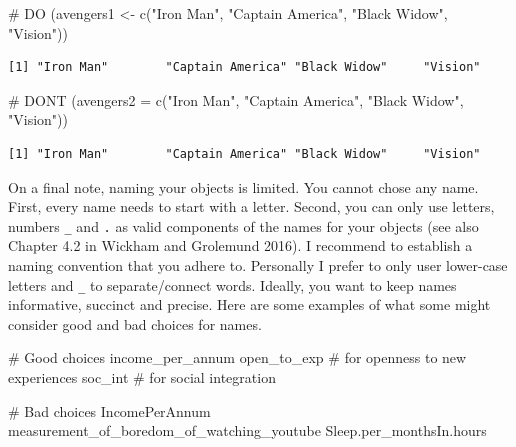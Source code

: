\documentclass[
  letterpaper,
  DIV=11,
  numbers=noendperiod]{scrreprt}
\newenvironment{Shaded}{\begin{snugshade}}{\end{snugshade}}
\newcommand{\AttributeTok}[1]{\textcolor[rgb]{0.40,0.45,0.13}{#1}}
\newcommand{\CommentTok}[1]{\textcolor[rgb]{0.37,0.37,0.37}{#1}}
\newcommand{\FunctionTok}[1]{\textcolor[rgb]{0.28,0.35,0.67}{#1}}
\newcommand{\NormalTok}[1]{\textcolor[rgb]{0.00,0.23,0.31}{#1}}
\newcommand{\OtherTok}[1]{\textcolor[rgb]{0.00,0.23,0.31}{#1}}
\newcommand{\StringTok}[1]{\textcolor[rgb]{0.13,0.47,0.30}{#1}}
\begin{document}
\begin{Shaded}
\begin{Highlighting}[]
\CommentTok{\# DO}
\NormalTok{(avengers1 }\OtherTok{\textless{}{-}} \FunctionTok{c}\NormalTok{(}\StringTok{"Iron Man"}\NormalTok{,}
                \StringTok{"Captain America"}\NormalTok{,}
                \StringTok{"Black Widow"}\NormalTok{,}
                \StringTok{"Vision"}\NormalTok{))}
\end{Highlighting}
\end{Shaded}

\begin{verbatim}
[1] "Iron Man"        "Captain America" "Black Widow"     "Vision"         
\end{verbatim}

\begin{Shaded}
\begin{Highlighting}[]
\CommentTok{\# DON\textquotesingle{}T}
\NormalTok{(}\AttributeTok{avengers2 =} \FunctionTok{c}\NormalTok{(}\StringTok{"Iron Man"}\NormalTok{,}
               \StringTok{"Captain America"}\NormalTok{,}
               \StringTok{"Black Widow"}\NormalTok{,}
               \StringTok{"Vision"}\NormalTok{))}
\end{Highlighting}
\end{Shaded}

\begin{verbatim}
[1] "Iron Man"        "Captain America" "Black Widow"     "Vision"         
\end{verbatim}

On a final note, naming your objects is limited. You cannot chose any
name. First, every name needs to start with a letter. Second, you can
only use letters, numbers \texttt{\_} and \texttt{.} as valid components
of the names for your objects (see also Chapter 4.2 in Wickham and
Grolemund 2016). I recommend to establish a naming convention that you
adhere to. Personally I prefer to only user lower-case letters and
\texttt{\_} to separate/connect words. Ideally, you want to keep names
informative, succinct and precise. Here are some examples of what some
might consider good and bad choices for names.

\begin{Shaded}
\begin{Highlighting}[]
\CommentTok{\# Good choices}
\NormalTok{income\_per\_annum}
\NormalTok{open\_to\_exp          }\CommentTok{\# for \textquotesingle{}openness to new experiences\textquotesingle{}}
\NormalTok{soc\_int              }\CommentTok{\# for \textquotesingle{}social integration\textquotesingle{}}
 
\CommentTok{\# Bad choices}
\NormalTok{IncomePerAnnum}
\NormalTok{measurement\_of\_boredom\_of\_watching\_youtube}
\NormalTok{Sleep.per\_monthsIn.hours}
\end{Highlighting}
\end{Shaded}
\end{document}
